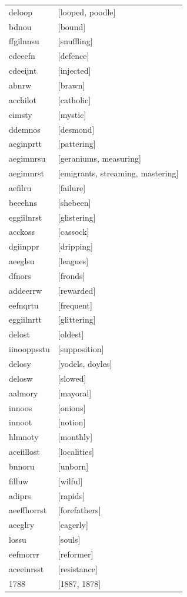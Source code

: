 \documentclass{article}
\begin{document}
\begin{tabular}{ll}
deloop & [looped, poodle] \\
bdnou & [bound] \\
ffgilnnsu & [snuffling] \\
cdeeefn & [defence] \\
cdeeijnt & [injected] \\
abnrw & [brawn] \\
acchilot & [catholic] \\
cimsty & [mystic] \\
ddemnos & [desmond] \\
aeginprtt & [pattering] \\
aegimnrsu & [geraniums, measuring] \\
aegimnrst & [emigrants, streaming, mastering] \\
aefilru & [failure] \\
beeehns & [shebeen] \\
eggiilnrst & [glistering] \\
acckoss & [cassock] \\
dgiinppr & [dripping] \\
aeeglsu & [leagues] \\
dfnors & [fronds] \\
addeerrw & [rewarded] \\
eefnqrtu & [frequent] \\
eggiilnrtt & [glittering] \\
delost & [oldest] \\
iinooppsstu & [supposition] \\
delosy & [yodels, doyles] \\
delosw & [slowed] \\
aalmory & [mayoral] \\
innoos & [onions] \\
innoot & [notion] \\
hlmnoty & [monthly] \\
aceiillost & [localities] \\
bnnoru & [unborn] \\
filluw & [wilful] \\
adiprs & [rapids] \\
aeeffhorrst & [forefathers] \\
aeeglry & [eagerly] \\
lossu & [souls] \\
eefmorrr & [reformer] \\
aceeinrsst & [resistance] \\
1788 & [1887, 1878] \\

\end{tabular}
\end{document}
